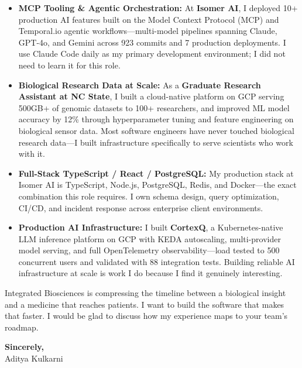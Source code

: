 \documentclass[11pt,letterpaper]{article}
\begin{document}
\begin{itemize}[leftmargin=*, itemsep=6pt, label={\color{IBSTeal}\faAngleRight}]
    \item \textbf{MCP Tooling \& Agentic Orchestration:} At \textbf{Isomer AI}, I deployed 10+ production AI features built on the Model Context Protocol (MCP) and Temporal.io agentic workflows---multi-model pipelines spanning Claude, GPT-4o, and Gemini across 923 commits and 7 production deployments. I use Claude Code daily as my primary development environment; I did not need to learn it for this role.

    \item \textbf{Biological Research Data at Scale:} As a \textbf{Graduate Research Assistant at NC State}, I built a cloud-native platform on GCP serving 500GB+ of genomic datasets to 100+ researchers, and improved ML model accuracy by 12\% through hyperparameter tuning and feature engineering on biological sensor data. Most software engineers have never touched biological research data---I built infrastructure specifically to serve scientists who work with it.

    \item \textbf{Full-Stack TypeScript / React / PostgreSQL:} My production stack at Isomer AI is TypeScript, Node.js, PostgreSQL, Redis, and Docker---the exact combination this role requires. I own schema design, query optimization, CI/CD, and incident response across enterprise client environments.

    \item \textbf{Production AI Infrastructure:} I built \textbf{CortexQ}, a Kubernetes-native LLM inference platform on GCP with KEDA autoscaling, multi-provider model serving, and full OpenTelemetry observability---load tested to 500 concurrent users and validated with 88 integration tests. Building reliable AI infrastructure at scale is work I do because I find it genuinely interesting.
\end{itemize}

\vspace{6pt}

Integrated Biosciences is compressing the timeline between a biological insight and a medicine that reaches patients. I want to build the software that makes that faster. I would be glad to discuss how my experience maps to your team's roadmap.

\vspace{12pt}

\textbf{Sincerely,}\\[8pt]
Aditya Kulkarni
\end{document}
